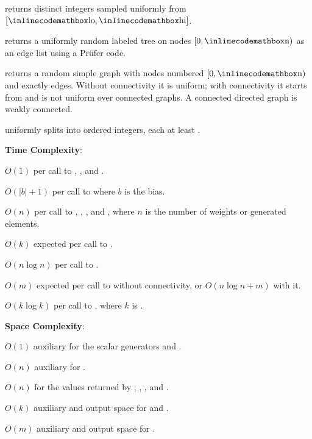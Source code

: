 \begin{compactitem}
  \item {} returns  distinct integers sampled uniformly from $[{\inlinecodemath{lo}}, {\inlinecodemath{hi}}]$.
  \item {} returns a uniformly random labeled tree on nodes $[0, {\inlinecodemath{n}})$ as an edge list using a Prüfer code.
  \item {} returns a random simple graph with  nodes numbered $[0, {\inlinecodemath{n}})$ and exactly  edges. Without connectivity it is uniform; with connectivity it starts from  and is not uniform over connected graphs. A connected directed graph is weakly connected.
  \item {} uniformly splits  into  ordered integers, each at least .
\end{compactitem}

\textbf{Time Complexity}:
\begin{compactitem}
  \item $O(1)$ per call to , , and .
  \item $O(|b| + 1)$ per call to  where $b$ is the bias.
  \item $O(n)$ per call to , , , and , where $n$ is the number of weights or generated elements.
  \item $O(k)$ expected per call to .
  \item $O(n \log n)$ per call to .
  \item $O(m)$ expected per call to  without connectivity, or $O(n \log n + m)$ with it.
  \item $O(k \log k)$ per call to , where $k$ is .
\end{compactitem}

\textbf{Space Complexity}:
\begin{compactitem}
  \item $O(1)$ auxiliary for the scalar generators and .
  \item $O(n)$ auxiliary for .
  \item $O(n)$ for the values returned by , , , and .
  \item $O(k)$ auxiliary and output space for  and .
  \item $O(m)$ auxiliary and output space for .
\end{compactitem}

